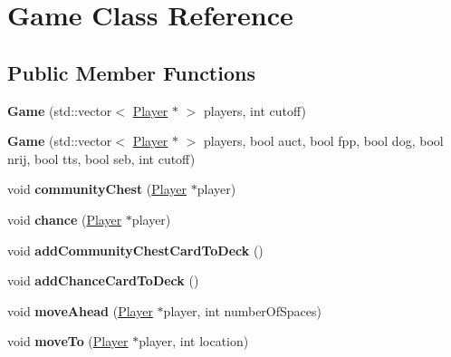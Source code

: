 \hypertarget{classGame}{\section{Game Class Reference}
\label{classGame}
}
\subsection*{Public Member Functions}
\begin{DoxyCompactItemize}
\item 
\hypertarget{classGame_aa28c135d49f2b1a3fcfb1b2f79178cc0}{{\bfseries Game} (std\-::vector$<$ \hyperlink{classPlayer}{Player} $\ast$ $>$ players, int cutoff)}\label{classGame_aa28c135d49f2b1a3fcfb1b2f79178cc0}

\item 
\hypertarget{classGame_ac22697e224f8d530e78cc9af8a846e0e}{{\bfseries Game} (std\-::vector$<$ \hyperlink{classPlayer}{Player} $\ast$ $>$ players, bool auct, bool fpp, bool dog, bool nrij, bool tts, bool seb, int cutoff)}\label{classGame_ac22697e224f8d530e78cc9af8a846e0e}

\item 
\hypertarget{classGame_af23ffe4fa92788a16cab974079eb8f18}{void {\bfseries community\-Chest} (\hyperlink{classPlayer}{Player} $\ast$player)}\label{classGame_af23ffe4fa92788a16cab974079eb8f18}

\item 
\hypertarget{classGame_abdafb0534eece81e9ddd193416584be7}{void {\bfseries chance} (\hyperlink{classPlayer}{Player} $\ast$player)}\label{classGame_abdafb0534eece81e9ddd193416584be7}

\item 
\hypertarget{classGame_a9ac6d7d1cd1eec622d3189441385253f}{void {\bfseries add\-Community\-Chest\-Card\-To\-Deck} ()}\label{classGame_a9ac6d7d1cd1eec622d3189441385253f}

\item 
\hypertarget{classGame_a2d15f486ee8c4f1cb0911379eb837de4}{void {\bfseries add\-Chance\-Card\-To\-Deck} ()}\label{classGame_a2d15f486ee8c4f1cb0911379eb837de4}

\item 
\hypertarget{classGame_ae6650a0ea1a92ba51359bcd586234da8}{void {\bfseries move\-Ahead} (\hyperlink{classPlayer}{Player} $\ast$player, int number\-Of\-Spaces)}\label{classGame_ae6650a0ea1a92ba51359bcd586234da8}

\item 
\hypertarget{classGame_a648c5489222cdf6ab66162b7d11afb9f}{void {\bfseries move\-To} (\hyperlink{classPlayer}{Player} $\ast$player, int location)}\label{classGame_a648c5489222cdf6ab66162b7d11afb9f}


\end{DoxyCompactItemize}
